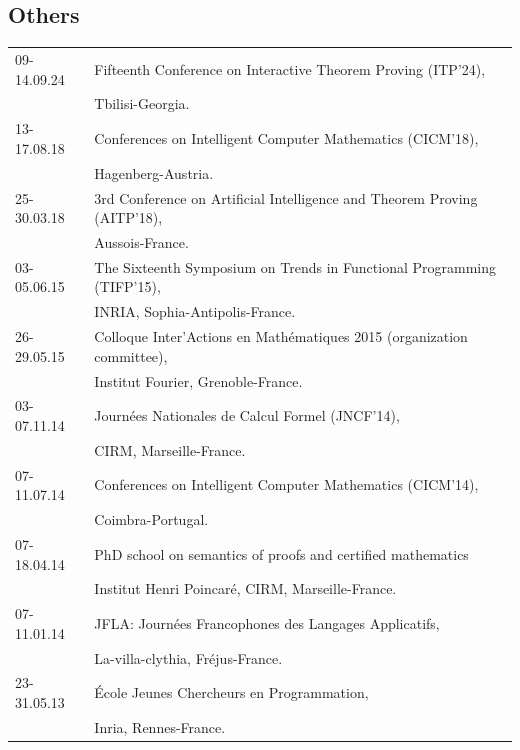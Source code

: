\documentclass[a4paper,9pt]{article} %
\begin{document}
\subsection*{Others}
\begin{longtable}{ll}	
{\small09-14.09.24} & Fifteenth Conference on Interactive Theorem Proving (ITP'24),\\
& Tbilisi-Georgia.\\[0.25cm]
{\small13-17.08.18} & Conferences on Intelligent Computer Mathematics (CICM'18),\\
& Hagenberg-Austria.\\[0.25cm]
{\small25-30.03.18} & 3rd Conference on Artificial Intelligence and Theorem Proving (AITP'18),\\
& Aussois-France.\\[0.25cm]
{\small03-05.06.15} & The Sixteenth Symposium on Trends in Functional Programming (TIFP'15),\\
& INRIA, Sophia-Antipolis-France.\\[0.25cm]
{\small26-29.05.15}  & Colloque Inter'Actions en Mathématiques 2015 (organization committee), \\
& Institut Fourier, Grenoble-France.\\[0.25cm]
{\small03-07.11.14} & Journées Nationales de Calcul Formel (JNCF'14),\\
& CIRM, Marseille-France.\\[0.25cm]
{\small07-11.07.14} & Conferences on Intelligent Computer Mathematics (CICM'14), \\
& Coimbra-Portugal.\\[0.25cm]
{\small07-18.04.14} & PhD school on semantics of proofs and certified mathematics \\
& Institut Henri Poincaré, CIRM, Marseille-France. \\[0.25cm]
{\small07-11.01.14} & JFLA: Journées Francophones des Langages Applicatifs, \\
& La-villa-clythia, Fréjus-France. \\[0.25cm]
{\small23-31.05.13} & École Jeunes Chercheurs en Programmation,\\
& Inria, Rennes-France.
\end{longtable}
\end{document}
